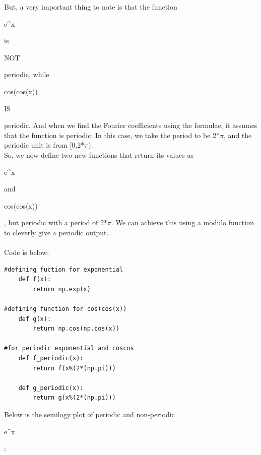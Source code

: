 \documentclass[11pt]{article}
\begin{document}
But, a very important thing to note is that the function \begin{textit}e^{x}\end{textit} is \begin{textbf}{NOT}\end{textbf} periodic, while \begin{textit}cos(cos(x))\end{textit} \begin{textbf}{IS}\end{textbf} periodic.   And when we find the Fourier coefficients using the formulae, it assumes that the function is periodic. In this case, we take the period to be 2*$\pi$, and the periodic unit is from [0,2*$\pi$).\\

So, we now define two new functions that return its values as \begin{textit}e^{x}\end{textit} and \begin{textit}cos(cos(x))\end{textit}, but periodic with a period of 2*$\pi$. We can achieve this using a modulo function to cleverly give a periodic output. \\\\  Code is below:

\begin{verbatim}
#defining fuction for exponential
    def f(x):
    	return np.exp(x)
    
#defining function for cos(cos(x))
    def g(x):
    	return np.cos(np.cos(x))
  
#for periodic exponential and coscos  
    def f_periodic(x):
    	return f(x%(2*(np.pi)))
    
    def g_periodic(x):
    	return g(x%(2*(np.pi)))
\end{verbatim}

Below is the semilogy plot of periodic and non-periodic \begin{textit}e^{x}\end{textit}:
\end{document}
